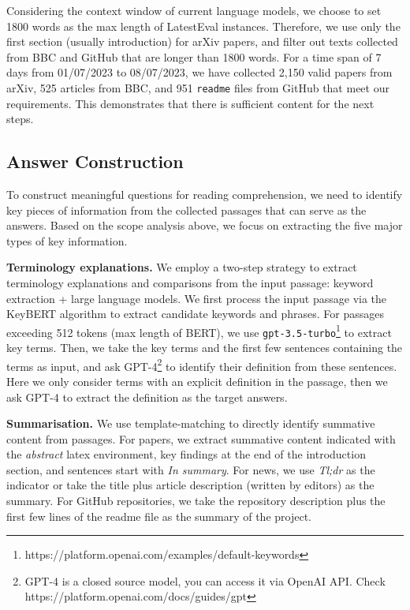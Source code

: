 \documentclass[letterpaper]{article} %
\begin{document}
Considering the context window of current language models, we choose to set 1800 words as the max length of LatestEval instances. Therefore, we use only the first section (usually introduction) for arXiv papers, and filter out texts collected from BBC and GitHub that are longer than 1800 words. For a time span of 7 days from 01/07/2023 to 08/07/2023,
we have collected 2,150 valid papers from arXiv, 525 articles from BBC, and 951 \texttt{readme} files from GitHub that meet our requirements. This demonstrates that there is sufficient content for the next steps.

\subsection{Answer Construction}

To construct meaningful questions for reading comprehension, we need to identify key pieces of information from the collected passages that can serve as the answers. Based on the scope analysis above, we focus on extracting the five major types of key information.

\noindent\textbf{Terminology explanations.} We employ a two-step strategy to extract terminology explanations and comparisons from the input passage: keyword extraction + large language models. We first process the input passage via the KeyBERT \cite{grootendorst2020keybert} algorithm to extract candidate keywords and phrases. For passages exceeding 512 tokens (max length of BERT), we use \texttt{gpt-3.5-turbo}\footnote{https://platform.openai.com/examples/default-keywords} to extract key terms. Then, we take the key terms and the first few sentences containing the terms as input, and ask GPT-4\footnote{GPT-4 is a closed source model, you can access it via OpenAI API. Check https://platform.openai.com/docs/guides/gpt} to identify their definition from these sentences. Here we only consider terms with an explicit definition in the passage, then we ask GPT-4 to extract the definition as the target answers.

\noindent\textbf{Summarisation.} We use template-matching to directly identify summative content from passages. For papers, we extract summative content indicated with the \textit{abstract} latex environment, key findings at the end of the introduction section, and sentences start with \textit{In summary}. For news, we use \textit{Tl;dr} as the indicator or take the title plus article description (written by editors) as the summary. For GitHub repositories, we take the repository description plus the first few lines of the readme file as the summary of the project.
\end{document}
